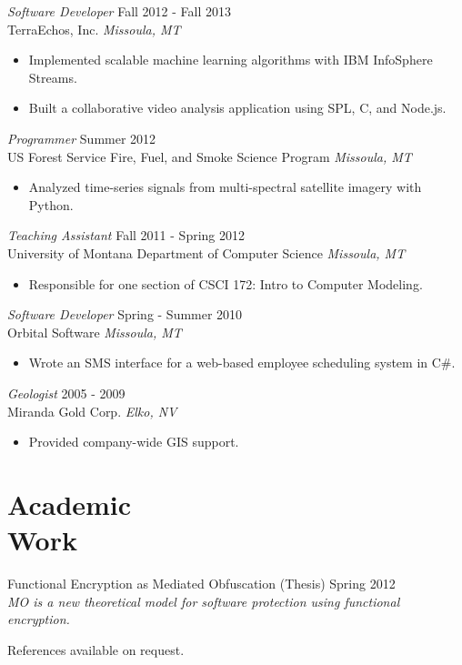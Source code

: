 \documentclass[line,margin]{res}
\begin{document}
\begin{resume}
        {\sl Software Developer} \hfill  Fall 2012 - Fall 2013\\
        TerraEchos, Inc. \hfill {\sl Missoula, MT}
        \begin{itemize} \itemsep -2pt
            \item Implemented scalable machine learning algorithms with IBM InfoSphere\textsuperscript{\textregistered} Streams.
            \item Built a collaborative video analysis application using SPL, C, and Node.js.
        \end{itemize}

        {\sl Programmer} \hfill  Summer 2012\\
        US Forest Service Fire, Fuel, and Smoke Science Program \hfill {\sl Missoula, MT}
        \begin{itemize} \itemsep -2pt
            \item Analyzed time-series signals from multi-spectral satellite imagery with Python.
        \end{itemize}

        {\sl Teaching Assistant} \hfill  Fall 2011 - Spring 2012\\
        University of Montana Department of Computer Science \hfill {\sl Missoula, MT}
        \begin{itemize} \itemsep -2pt
            \item Responsible for one section of CSCI 172: Intro to Computer Modeling.
        \end{itemize}

        {\sl Software Developer} \hfill Spring - Summer 2010\\
        Orbital Software \hfill {\sl Missoula, MT}
        \begin{itemize} \itemsep -2pt
            \item Wrote an SMS interface for a web-based employee scheduling system in C\#.
        \end{itemize}

        {\sl Geologist} \hfill 2005 - 2009 \\
        Miranda Gold Corp. \hfill {\sl Elko, NV}
        \begin{itemize}  \itemsep -2pt %
            \item Provided company-wide GIS support.
        \end{itemize}

\section{\sc Academic\\ Work}

        Functional Encryption as Mediated Obfuscation (Thesis) \hfill Spring 2012\\
            \emph{MO is a new theoretical model for software protection using functional encryption.}

References available on request.
\end{resume}
\end{document}
